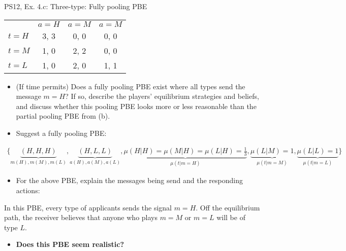 \begin{frame}{PS12, Ex. 4.c: Three-type: Fully pooling PBE}
    \begin{table}
      \begin{tabular}{l|c|c|c|}
          \multicolumn{1}{c}{} & \multicolumn{1}{c}{$a=H$} & \multicolumn{1}{c}{$a=M$} & \multicolumn{1}{c}{$a=M$} \\\cline{2-4}
          $t=H$ & 3, 3 & 0, 0 & 0, 0 \\\cline{2-4}
          $t=M$ & 1, 0 & 2, 2 & 0, 0 \\\cline{2-4}
          $t=L$ & 1, 0 & 2, 0 & 1, 1 \\\cline{2-4}
      \end{tabular}
    \end{table}\vspace{-8pt}
    \begin{itemize}
      \item[(c)] (If time permits) Does a fully pooling PBE exist where all types send the message $m = H$? If so, describe the players’ equilibrium strategies and beliefs, and discuss whether this pooling PBE looks more or less reasonable than the partial pooling PBE from (b).
      \item[Step 1:] Suggest a fully pooling PBE:
    \end{itemize}\vspace{-12pt}
    \begin{align*}
      \{\underbrace{(H,H,H)}_{m(H),m(M),m(L)},\underbrace{(H,L,L)}_{a(H),a(M),a(L)},\underbrace{\mu(H|H)=\mu(M|H)=\mu(L|H)=\frac{1}{3}}_{\mu(t|m=H)},\underbrace{\mu(L|M)=1}_{\mu(t|m=M)},\underbrace{\mu(L|L)=1}_{\mu(t|m=L)}\}
    \end{align*}\vspace{-14pt}
    \begin{itemize}
        \item[Step 2:] For the above PBE, explain the messages being send and the responding actions:
    \end{itemize}\vspace{-2pt}
    In this PBE, every type of applicants sends the signal $m=H$. Off the equilibrium path, the receiver believes that anyone who plays $m=M$ or $m=L$ will be of type $L$.\vspace{-2pt}
    \begin{itemize}
        \item[Step 3:] \textbf{Does this PBE seem realistic?}
    \end{itemize}
    \vfill\null
\end{frame}
